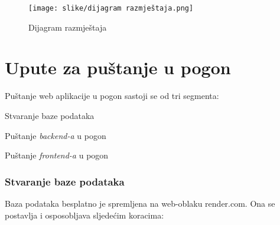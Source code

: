 		\begin{figure}[H]
			\texttt{[image: slike/dijagram razmještaja.png]}
			\centering
			\caption{Dijagram razmještaja}
			\label{fig:dijagram razmještaja}
		\end{figure}
			\eject 

		\section{Upute za puštanje u pogon}
		
			Puštanje web aplikacije u pogon sastoji se od tri segmenta:

			\begin{packed_item}
				\item Stvaranje baze podataka
				\item Puštanje \textit{backend-a} u pogon
				\item Puštanje \textit{frontend-a} u pogon
			\end{packed_item}

			\subsubsection{Stvaranje baze podataka}

			Baza podataka besplatno je spremljena na web-oblaku render.com. 
			Ona se postavlja i osposobljava sljedećim koracima:

